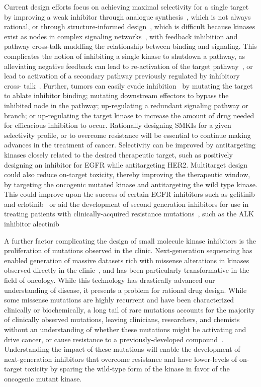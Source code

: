 \documentclass[phd,tocprelim]{cornell}
\begin{document}
Current design efforts focus on achieving maximal selectivity for a single target by improving a weak inhibitor through analogue synthesis~\citep{Zhang2009-il}, which is not always rational, or through structure-informed design~\citep{Zhang2009-il,Huggins2012-hr}, which is difficult because kinases exist as nodes in complex signaling networks~\citep{Mendoza2011-bj,Tricker2015-xx}, with feedback inhibition and pathway cross-talk muddling the relationship between binding and signaling. This complicates the notion of inhibiting a single kinase to shutdown a pathway, as alleviating negative feedback can lead to re-activation of the target pathway~\citep{Chandarlapaty2011-cq,Mendoza2011-bj}, or lead to activation of a secondary pathway previously regulated by inhibitory cross- talk~\citep{Mendoza2011-bj,Bailey2014-pd}. Further, tumors can easily evade inhibition~\citep{Knight:Nat.Rev.Cancer:2010} by mutating the target to ablate inhibitor binding; mutating downstream effectors to bypass the inhibited node in the pathway; up-regulating a redundant signaling pathway or branch; or up-regulating the target kinase to increase the amount of drug needed for efficacious inhibition to occur. Rationally designing SMKIs for a given selectivity profile, or to overcome resistance will be essential to continue making advances in the treatment of cancer. Selectivity can be improved by antitargeting kinases closely related to the desired therapeutic target, such as positively designing an inhibitor for EGFR while antitargeting HER2. Multitarget design could also reduce on-target toxicity, thereby improving the therapeutic window, by targeting the oncogenic mutated kinase and antitargeting the wild type kinase. This could improve upon the success of certain EGFR inhibitors such as gefitinib and erlotinib~\citep{Littlefield:Chem.Biol.:2014,Yun:2007jz,Gajiwala:2013bn} or aid the development of second generation inhibitors for use in treating patients with clinically-acquired resistance mutations~\citep{Jia:2016di,Drilon:2017gb,Politi:2015fg}, such as the ALK inhibitor alectinib~\citep{Song:2015gu}

A further factor complicating the design of small molecule kinase inhibitors is the proliferation of mutations observed in the clinic. Next-generation sequencing has enabled generation of massive datasets rich with missense alterations in kinases observed directly in the clinic~\citep{Varghese:2014jw,Zehir:2017ib,Garraway:2013kn}, and has been particularly transformative in the field of oncology. While this technology has drastically advanced our understanding of disease, it presents a problem for rational drug design.  While some missense mutations are highly recurrent and have been characterized clinically or biochemically, a long tail of rare mutations accounts for the majority of clinically observed mutations, leaving clinicians, researchers, and chemists without an understanding of whether these mutations might be activating and drive cancer, or cause resistance to a previously-developed compound~\citep{Hauser:2018vz}. Understanding the impact of these mutations will enable the development of next-generation inhibitors that overcome resistance and have lower-levels of on-target toxicity by sparing the wild-type form of the kinase in favor of the oncogenic mutant kinase. 
\end{document}

